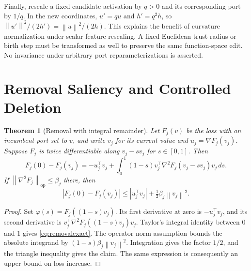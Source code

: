 \documentclass[10pt]{article}
\theoremstyle{paper}
\newtheorem{theorem}{Theorem}[section]
\newcommand{\norm}[1]{\left\lVert #1\right\rVert}
\begin{document}
Finally, rescale a fixed candidate activation by $q>0$ and its corresponding port by $1/q$. In the new coordinates, $u'=qu$ and $h'=q^2h$, so $\norm{u'}^2/(2h')=\norm u^2/(2h)$. This explains the benefit of curvature normalization under scalar feature rescaling. A fixed Euclidean trust radius or birth step must be transformed as well to preserve the same function-space edit. No invariance under arbitrary port reparameterizations is asserted.

\section{Removal Saliency and Controlled Deletion}
\label{app:removal}
\begin{theorem}[Removal with integral remainder]
\label{thm:removal}
Let $F_j(v)$ be the loss with an incumbent port set to $v$, and write $v_j$ for its current value and $u_j=\nabla F_j(v_j)$. Suppose $F_j$ is twice differentiable along $v_j-sv_j$ for $s\in[0,1]$. Then
\begin{equation}
F_j(0)-F_j(v_j)=-u_j^\top v_j+
\int_0^1(1-s)v_j^\top\nabla^2F_j(v_j-sv_j)v_j\,ds.
\label{eq:removalexact}
\end{equation}
If $\norm{\nabla^2F_j}_{\mathrm{op}}\le\beta_j$ there, then
\[
|F_j(0)-F_j(v_j)|\le|u_j^\top v_j|+\tfrac12\beta_j\norm{v_j}^2.
\]
\end{theorem}
\begin{proof}
Set $\varphi(s)=F_j((1-s)v_j)$. Its first derivative at zero is $-u_j^\top v_j$, and its second derivative is $v_j^\top\nabla^2F_j((1-s)v_j)v_j$. Taylor's integral identity between $0$ and $1$ gives \cref{eq:removalexact}. The operator-norm assumption bounds the absolute integrand by $(1-s)\beta_j\norm{v_j}^2$. Integration gives the factor $1/2$, and the triangle inequality gives the claim. The same expression is consequently an upper bound on loss increase.
\end{proof}
\end{document}
